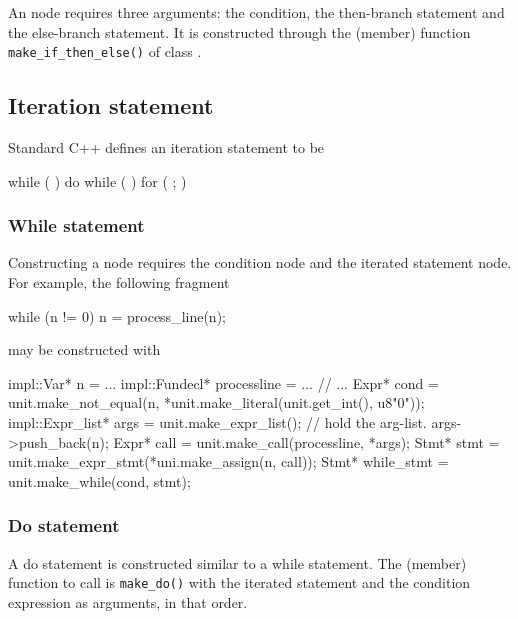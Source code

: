 \documentclass[11pt]{article}
\begin{document}
An  node requires three arguments: the
condition, the then-branch statement and the else-branch statement.  It is
constructed through the (member) function \texttt{make\_if\_then\_else()} of
class .

\subsection{Iteration statement}
\label{sec:stmt.iteration}

Standard C++ defines an iteration statement to be 
\begin{Grammar}
      while (  ) 
      do  while (  )
      for (   ;  ) 
\end{Grammar}


\subsubsection{While statement}
\label{sec:stmt.iteration.while}

Constructing a  node requires the condition node and
the iterated statement node.  For example, the following fragment
\begin{Program}
  while (n != 0)
     n = process_line(n);
\end{Program}
may be constructed with
\begin{Program}
  impl::Var* n = ...
  impl::Fundecl* processline = ...
  // ...
  Expr* cond = unit.make_not_equal(n, *unit.make_literal(unit.get_int(), u8"0"));
  impl::Expr_list* args = unit.make_expr_list(); // hold the arg-list.
  args->push_back(n);  
  Expr* call = unit.make_call(processline, *args);
  Stmt* stmt = unit.make_expr_stmt(*uni.make_assign(n, call));
  Stmt* while_stmt = unit.make_while(cond, stmt);
\end{Program}


\subsubsection{Do statement}

A do statement is constructed similar to a while statement.  The
(member) function to call is \texttt{make\_do()} with the
iterated statement and the condition expression as arguments, in that order. 
\end{document}
